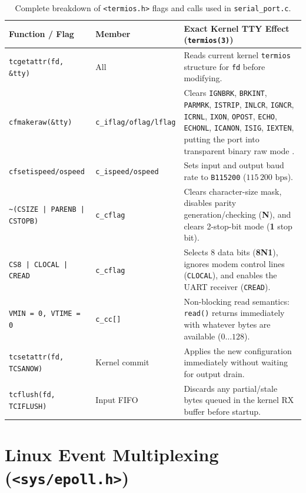 \documentclass[11pt,a4paper,oneside]{report}
\begin{document}
\begin{table}[!htbp]
\centering
\caption{Complete breakdown of \texttt{<termios.h>} flags and calls used in \texttt{serial\_port.c}.}
\label{tab:ch5_termios}
\begin{tabularx}{\linewidth}{l l X}
\toprule
\textbf{Function / Flag} & \textbf{Member} & \textbf{Exact Kernel TTY Effect (\texttt{termios(3)})} \\
\midrule
\texttt{tcgetattr(fd, \&tty)} & All & Reads current kernel \texttt{termios} structure for \texttt{fd} before modifying. \\
\texttt{cfmakeraw(\&tty)} & \texttt{c\_iflag/oflag/lflag} & Clears \texttt{IGNBRK}, \texttt{BRKINT}, \texttt{PARMRK}, \texttt{ISTRIP}, \texttt{INLCR}, \texttt{IGNCR}, \texttt{ICRNL}, \texttt{IXON}, \texttt{OPOST}, \texttt{ECHO}, \texttt{ECHONL}, \texttt{ICANON}, \texttt{ISIG}, \texttt{IEXTEN}, putting the port into transparent binary raw mode \cite{man_termios}. \\
\texttt{cfsetispeed/ospeed} & \texttt{c\_ispeed/ospeed} & Sets input and output baud rate to \texttt{B115200} ($115\,200\text{ bps}$). \\
\texttt{\textasciitilde(CSIZE | PARENB | CSTOPB)} & \texttt{c\_cflag} & Clears character-size mask, disables parity generation/checking (\textbf{N}), and clears 2-stop-bit mode (\textbf{1} stop bit). \\
\texttt{CS8 | CLOCAL | CREAD} & \texttt{c\_cflag} & Selects 8 data bits (\textbf{8N1}), ignores modem control lines (\texttt{CLOCAL}), and enables the UART receiver (\texttt{CREAD}). \\
\texttt{VMIN = 0, VTIME = 0} & \texttt{c\_cc[]} & Non-blocking read semantics: \texttt{read()} returns immediately with whatever bytes are available ($0\dots 128$). \\
\texttt{tcsetattr(fd, TCSANOW)} & Kernel commit & Applies the new configuration immediately without waiting for output drain. \\
\texttt{tcflush(fd, TCIFLUSH)} & Input FIFO & Discards any partial/stale bytes queued in the kernel RX buffer before startup. \\
\bottomrule
\end{tabularx}
\end{table}

\section{Linux Event Multiplexing (\texttt{<sys/epoll.h>})}
\end{document}
